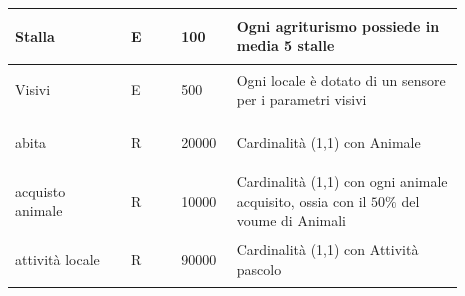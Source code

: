 \documentclass[12pt,a4paper]{article}
\begin{document}
\begin{center}
\begin{longtable}{|p{0.23\linewidth}|p{0.1\linewidth}|p{0.11\linewidth}|p{0.45\linewidth}|}
\hline
Stalla 				& \begin{center}
\vspace{-25pt}E
\end{center}
					& \begin{center}
					\vspace{-25pt}100\end{center}
					&  Ogni agriturismo possiede in media 5 stalle \\ 

\hline
Visivi 				& \begin{center}
\vspace{-25pt}E
\end{center}
					& \begin{center}
					\vspace{-25pt}500\end{center}
					&  Ogni locale è dotato di un sensore per i parametri visivi \\ 

\hline
abita 				& \begin{center}
\vspace{-25pt}R
\end{center}
					& \begin{center}
					\vspace{-25pt}20000\end{center}
					&  Cardinalità (1,1) con Animale \\ 

\hline
acquisto animale 				& \begin{center}
\vspace{-25pt}R
\end{center}
					& \begin{center}
					\vspace{-25pt}10000\end{center}
					&  Cardinalità (1,1) con ogni animale acquisito, ossia con il $50\%$ del voume di Animali \\ 

\hline
%
attività locale 				& \begin{center}
\vspace{-25pt}R
\end{center}
					& \begin{center}
					\vspace{-25pt}90000\end{center}
					&  Cardinalità (1,1) con Attività pascolo \\ 


\end{longtable}
\end{center}
\end{document}
